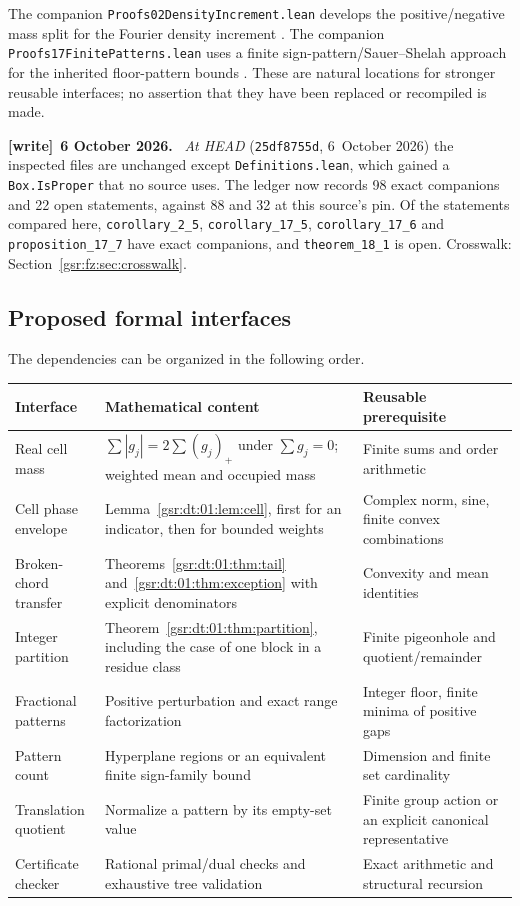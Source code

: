 \documentclass[11pt,letterpaper]{article}
\numberwithin{equation}{section}
\theoremstyle{definition}
\theoremstyle{remark}
\newcommand{\1}{\mathbf 1}
\newcommand{\code}[1]{\texttt{\small #1}}
\newcommand{\file}[1]{\nolinkurl{#1}}
\newenvironment{writenote}[1][]{\par\smallskip\begingroup\small
 \noindent\textbf{[write]}\if\relax\detokenize{#1}\relax\else~\textbf{#1.}\fi\ }%
 {\par\endgroup\smallskip}
\begin{document}
The companion \code{Proofs02DensityIncrement.lean} develops the
positive/negative mass split for the Fourier density increment
\cite{repo01density}. The companion \code{Proofs17FinitePatterns.lean}
uses a finite sign-pattern/Sauer--Shelah approach for the inherited
floor-pattern bounds \cite{repo01patterns}. These are natural locations for
stronger reusable interfaces; no assertion that they have been replaced
or recompiled is made.
\begin{writenote}[6 October 2026]
\emph{At HEAD} (\texttt{25df8755d}, 6~October 2026) the inspected files are unchanged except \file{Definitions.lean}, which gained a \texttt{Box.IsProper} that no source uses. The ledger now records 98 exact companions and 22 open statements, against 88 and 32 at this source's pin. Of the statements compared here, \file{corollary_2_5}, \file{corollary_17_5}, \file{corollary_17_6} and \file{proposition_17_7} have exact companions, and \file{theorem_18_1} is open. Crosswalk: Section~\ref{gsr:fz:sec:crosswalk}.
\end{writenote}

\subsection{Proposed formal interfaces}
The dependencies can be organized in the following order.

\begin{longtable}{@{}p{}p{}p{}@{}}
\toprule
Interface & Mathematical content & Reusable prerequisite\\
\midrule
\endhead
Real cell mass & $\sum |g_j|=2\sum(g_j)_+$ under $\sum g_j=0$;
weighted mean and occupied mass & Finite sums and order arithmetic\\
\addlinespace
Cell phase envelope & Lemma~\ref{gsr:dt:01:lem:cell}, first for an indicator,
then for bounded weights & Complex norm, sine, finite convex combinations\\
\addlinespace
Broken-chord transfer & Theorems~\ref{gsr:dt:01:thm:tail} and~\ref{gsr:dt:01:thm:exception}
with explicit denominators & Convexity and mean identities\\
\addlinespace
Integer partition & Theorem~\ref{gsr:dt:01:thm:partition}, including the case
of one block in a residue class & Finite pigeonhole and quotient/remainder\\
\addlinespace
Fractional patterns & Positive perturbation and exact range
factorization & Integer floor, finite minima of positive gaps\\
\addlinespace
Pattern count & Hyperplane regions or an equivalent finite
sign-family bound & Dimension and finite set cardinality\\
\addlinespace
Translation quotient & Normalize a pattern by its empty-set value &
Finite group action or an explicit canonical representative\\
\addlinespace
Certificate checker & Rational primal/dual checks and exhaustive tree
validation & Exact arithmetic and structural recursion\\
\bottomrule
\end{longtable}
\end{document}
